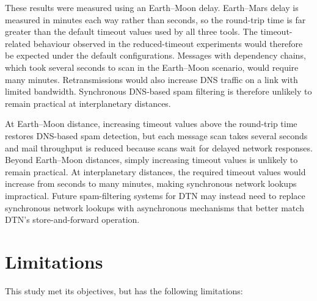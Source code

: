 These results were measured using an Earth--Moon delay. Earth--Mars delay is measured in minutes each way rather than seconds, so the round-trip time is far greater than the default timeout values used by all three tools. The timeout-related behaviour observed in the reduced-timeout experiments would therefore be expected under the default configurations. Messages with dependency chains, which took several seconds to scan in the Earth--Moon scenario, would require many minutes. Retransmissions would also increase DNS traffic on a link with limited bandwidth. Synchronous DNS-based spam filtering is therefore unlikely to remain practical at interplanetary distances.


At Earth--Moon distance, increasing timeout values above the round-trip time restores DNS-based spam detection, but each message scan takes several seconds and mail throughput is reduced because scans wait for delayed network responses. Beyond Earth--Moon distances, simply increasing timeout values is unlikely to remain practical. At interplanetary distances, the required timeout values would increase from seconds to many minutes, making synchronous network lookups impractical. Future spam-filtering systems for DTN may instead need to replace synchronous network lookups with asynchronous mechanisms that better match DTN's store-and-forward operation.

\section{Limitations}

This study met its objectives, but has the following limitations:

